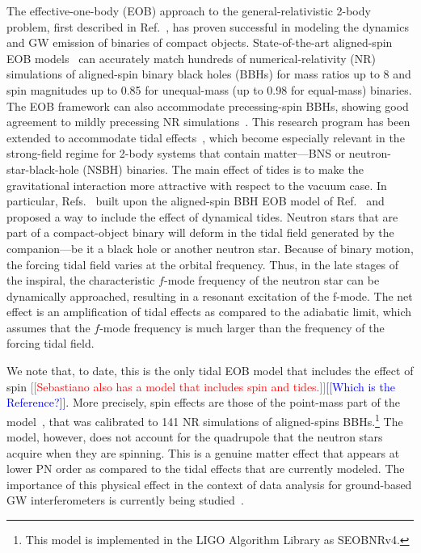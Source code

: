 \documentclass[prd,aps,letter,twocolumn,floatfix,notitlepage,nofootinbib]{revtex4-1}
\newcommand{\red}[1]{\textcolor{red}{#1}}
\newcommand{\blue}[1]{\textcolor{blue}{#1}}
\begin{document}
The effective-one-body (EOB) approach to the general-relativistic 2-body problem, first described in Ref.~\cite{Buonanno:1998gg}, has proven successful in modeling the dynamics and GW emission of binaries of compact objects. State-of-the-art aligned-spin EOB models~\cite{Bohe:2016gbl,Nagar:2017jdw} can accurately match hundreds of numerical-relativity (NR) simulations of aligned-spin binary black holes (BBHs) for mass ratios up to 8 and spin magnitudes up to 0.85 for unequal-mass (up to 0.98 for equal-mass) binaries. The EOB framework can also accommodate precessing-spin BBHs, showing good agreement to mildly precessing NR simulations~\cite{Babak:2016tgq}. This research program has been extended to accommodate tidal effects~\cite{Damour:2009wj,Vines:2010ca,Damour:2012yf,Bini:2012gu,Bernuzzi:2014owa,Hinderer:2016eia,Steinhoff:2016rfi,Dietrich:2017feu}, which become especially relevant in the strong-field regime for 2-body systems that contain matter---BNS or neutron-star-black-hole (NSBH) binaries. The main effect of tides is to make the gravitational interaction more attractive with respect to the vacuum case. In particular, Refs.~\cite{Hinderer:2016eia,Steinhoff:2016rfi} built upon the aligned-spin BBH EOB model of Ref.~\cite{Taracchini:2013rva} and proposed a way to include the effect of dynamical tides. Neutron stars that are part of a compact-object binary will deform in the tidal field generated by the companion---be it a black hole or another neutron star. Because of binary motion, the forcing tidal field varies at the orbital frequency. Thus, in the late stages of the inspiral, the characteristic $f$-mode frequency of the neutron star can be dynamically approached, resulting in a resonant excitation of the f-mode. The net effect is an amplification of tidal effects as compared to the adiabatic limit, which assumes that the $f$-mode frequency is much larger than the frequency of the forcing tidal field. 

We note that, to date, this is the only tidal EOB model that includes the effect of spin \red{[[Sebastiano also has a model that includes spin and tides.]]}\blue{[[Which is the Reference?]]}. More precisely, spin effects are those of the point-mass part of the model~\cite{Bohe:2016gbl}, that was calibrated to 141 NR simulations of aligned-spins BBHs.\footnote{This model is implemented in the LIGO Algorithm Library as SEOBNRv4.} The model, however, does not account for the quadrupole that the neutron stars acquire when they are spinning. This is a genuine matter effect that appears at lower PN order as compared to the tidal effects that are currently modeled. The importance of this physical effect in the context of data analysis for ground-based GW interferometers is currently being studied~\cite{IanTanja}.
\end{document}
